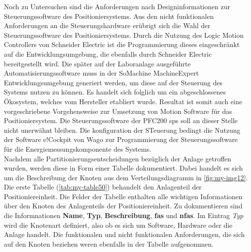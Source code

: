 \documentclass[../../../Bachelorarbeit.tex]{subfiles}
\begin{document}
Noch zu Untersuchen sind die Anforderungen nach Designinformationen zur Steuerungssoftware des Positioniersystems. Aus den nicht funktionalen Anforderungen an die Steuerungshardware erübrigt sich die Wahl der Steuerungssoftware des Positioniersystems. Durch die Nutzung des Logic Motion Controllers von Schneider Electric ist die Programmierung dieses eingeschränkt auf die Entwicklungsumgebung, die ebenfalls durch Schneider Electric bereitgestellt wird. Die später auf der Laboranlage ausgeführte Automatisierungssoftware muss in der SoMachine \bzw MachineExpert Entwicklungsumgebung generiert werden, um diese auf der Steuerung des Systems nutzen zu können. Es handelt sich folglich um ein abgeschlossenes Ökosystem, welches vom Hersteller etabliert wurde. Resultat ist somit auch eine vorgeschriebene Vorgehensweise zur Umsetzung von Motion Software für das Positioniersystem. Die Steuerungssoftware der PFC200 \ac{sps} soll an dieser Stelle nicht unerwähnt bleiben. Die konfiguration der STeuerung bedingt die Nutzung der Software e!Cockpit von Wago zur Programmierung der Steuerungssoftware für die Energiemessungskomponente des Systems.\\
Nachdem alle Partitionierungsentscheidungen bezüglich der Anlage getroffen wurden, werden diese in Form einer Tabelle dokumentiert. Dabei handelt es sich um die Beschreibung der Knoten aus dem Verteilungsdiagramm in \autoref{fig:my-img12}.\\
Die erste Tabelle (\autoref{tab:my-table50}) behandelt den Anlagenteil der Positioniereinheit. Die Felder der Tabelle enthalten alle wichtigen Informationen über den Knoten des Anlagenteils der Positioniereinheit. Zu dokumentieren sind die Informnationen \textbf{Name}, \textbf{Typ}, \textbf{Beschreibung}, \textbf{\acp{fa}} und \textbf{\acp{nfa}}. Im Eintrag \textit{Typ} wird die Knotenart definiert, also ob es sich um Software, Hardware oder die Anlage handelt. Die funktionalen und nicht funktionalen Anforderungen, die sich auf den Knoten beziehen weren ebenfalls in der Tabelle aufgenommen.
\end{document}
